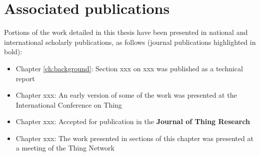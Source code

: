 
\clearpage
\section{Associated publications}
\label{sec:publications}

Portions of the work detailed in this thesis have been presented in national and international scholarly publications, as follows (journal publications highlighted in bold):

\begin{itemize}

\item	
Chapter \ref{ch:background}:
Section xxx on xxx
was published as a technical report 

\item	
Chapter xxx:
An early version of some of the work was presented at the International Conference on Thing %

\item	
Chapter xxx:
Accepted for publication in the \textbf{Journal of Thing Research}

\item	
Chapter xxx:
The work presented in sections of this chapter was presented at a meeting of the Thing Network

\end{itemize}